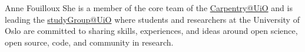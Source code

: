 \begin{participant}[type=leadPI,PM=24,gender=female]{Anne Fouilloux}
  She is a member of the core team of the \href{https://www.uio.no/english/for-employees/support/research/research-data/training/carpentry/}{Carpentry@UiO} and is leading the \href{https://uio-carpentry.github.io/studyGroup/}{studyGroup@UiO} where students and researchers at the University of Oslo are committed to sharing skills, experiences, and ideas around open science, open source, code, and community in research.
\end{participant}

